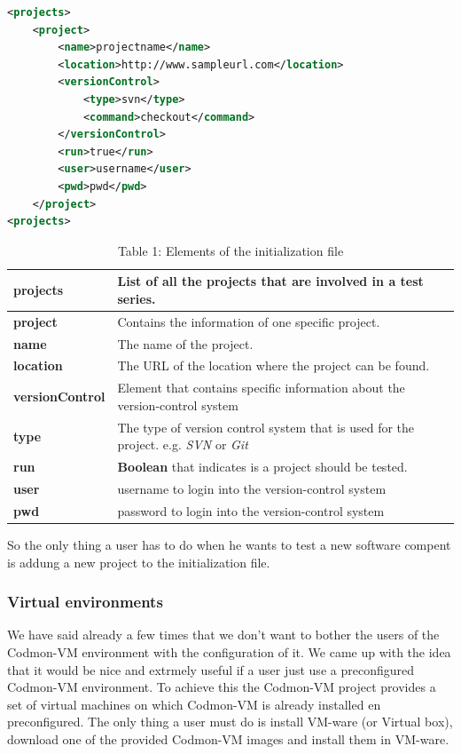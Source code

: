 \documentclass{article}
\newcommand{\project}{Codmon-VM}
\begin{document}
\begin{lstlisting}[frame=shadowbox, language=XML,showstringspaces=false]
 <projects>
	<project>
		<name>projectname</name>
		<location>http://www.sampleurl.com</location>
		<versionControl>
			<type>svn</type>
			<command>checkout</command>
		</versionControl>
		<run>true</run>
		<user>username</user>
		<pwd>pwd</pwd>
	</project>
<projects>
\end{lstlisting} 


\begin{table}
\centering
  \begin{tabular}{ | l| p{5cm} |}
  \hline
  \textbf{projects} & List of all the projects that are involved in a test series. \\ \hline
  \textbf{project} & Contains the information of one specific project. \\ \hline
  \textbf{name} & The name of the project. \\ \hline
  \textbf{location} & The URL of the location where the project can be found. \\ \hline
  \textbf{versionControl} & Element that contains specific information about the version-control system \\ \hline
  \textbf{type} & The type of version control system that is used for the project. e.g. \emph{SVN} or \emph{Git} \\ \hline
  \textbf{run} & \textbf{Boolean} that indicates is a project should be tested. \\ \hline
  \textbf{user} & username to login into the version-control system \\ \hline
  \textbf{pwd} & password to login into the version-control system \\ \hline
  \end{tabular}
\caption{Table 1: Elements of the initialization file}
\label{tab:init}
\end{table}

\noindent So the only thing a user has to do when he wants to test a new software compent is addung a new project to the initialization file.

\subsubsection{Virtual environments}
\label{imp:virual}
We have said already a few times that we don't want to bother the users of the \project{} environment with the configuration of it. We came up with the idea that it would be nice and extrmely useful if a 
user just use a preconfigured \project{} environment. To achieve this the \project{} project provides a set of virtual machines on which \project{} is already installed en preconfigured. The only thing a 
user must do is install VM-ware (or Virtual box), download one of the provided \project{} images and install them in VM-ware.\\
\end{document}
